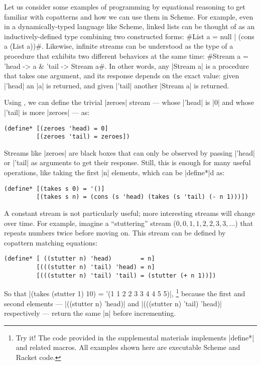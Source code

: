 Let us consider some examples of programming by equational reasoning to get familiar with copatterns and how we can use them in Scheme.
For example, even in a dynamically-typed language like Scheme, linked lists can be thought of as an inductively-defined type combining two constructed forms: \scm#List a = null | (cons a (List a))#.
Likewise, infinite streams can be understood as the type of a procedure that exhibits two different behaviors at the same time: \scm#Stream a = 'head -> a & 'tail -> Stream a#.
In other words, any \scm|Stream a| is a procedure that takes one argument, and its response depends on the exact value: given \scm|'head| an \scm|a| is returned, and given \scm|'tail| another \scm|Stream a| is returned.

Using , we can define the trivial \scm|zeroes| stream  --- whose \scm|'head| is \scm|0| and whose \scm|'tail| is more \scm|zeroes| --- as:
\begin{verbatim}
(define* [(zeroes 'head) = 0]
         [(zeroes 'tail) = zeroes])
\end{verbatim}
Streams like \scm|zeroes| are black boxes that can only be observed by passing \scm|'head| or \scm|'tail| as arguments to get their response.
Still, this is enough for many useful operations, like taking the first \scm|n| elements, which can be \scm|define*|d as:
\begin{verbatim}
(define* [(takes s 0) = '()]
         [(takes s n) = (cons (s 'head) (takes (s 'tail) (- n 1)))])
\end{verbatim}
A constant stream is not particularly useful; more interesting streams will change over time.
For example, imagine a ``stuttering'' stream ($0, 0, 1, 1, 2, 2, 3, 3, \dots$) that repeats numbers twice before moving on.
This stream can be defined by copattern matching equations:
\begin{verbatim}
(define* [ ((stutter n) 'head)        = n]
         [(((stutter n) 'tail) 'head) = n]
         [(((stutter n) 'tail) 'tail) = (stutter (+ n 1))])
\end{verbatim}
So that \scm|(takes (stutter 1) 10) = '(1 1 2 2 3 3 4 4 5 5)|,%
\footnote{
  Try it!
  The code provided in the supplemental materials implements \scm|define*| and related macros.
  All examples shown here are executable Scheme and Racket code.
}
because the first and second elements --- \scm|((stutter n) 'head)| and \scm|(((stutter n) 'tail) 'head)| respectively --- return the same \scm|n| before incrementing.

